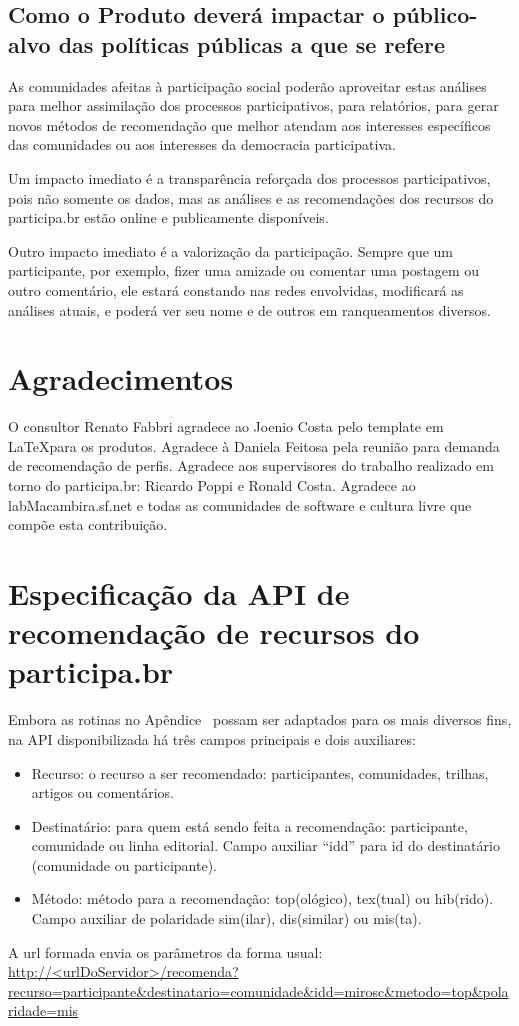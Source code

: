 \documentclass[12pt]{article}
\begin{document}
\subsection{Como o Produto deverá impactar o público-alvo das políticas públicas a que se refere}
As comunidades afeitas à participação social poderão aproveitar estas análises para melhor assimilação dos processos participativos, para relatórios, para gerar novos métodos de recomendação que melhor atendam aos interesses específicos das comunidades ou aos interesses da democracia participativa.

Um impacto imediato é a transparência reforçada dos processos participativos, pois não somente os dados, mas as análises e as recomendações dos recursos do participa.br estão online e publicamente disponíveis.

Outro impacto imediato é a valorização da participação. Sempre que um participante, por exemplo, fizer uma amizade ou comentar uma postagem ou outro comentário, ele estará constando nas redes envolvidas, modificará as análises atuais, e poderá ver seu nome e de outros em ranqueamentos diversos.

\section{Agradecimentos}
O consultor Renato Fabbri agradece ao Joenio Costa pelo template em \LaTeX para os produtos. Agradece à Daniela Feitosa pela reunião para demanda de recomendação de perfis. Agradece aos supervisores do trabalho realizado em torno do participa.br: Ricardo Poppi e Ronald Costa. Agradece ao labMacambira.sf.net e todas as comunidades de software e cultura livre que compõe esta contribuição.
\newpage

\newpage

\newpage
\printindex
\newpage
%
\appendix
\section{Especificação da API de recomendação de recursos do participa.br}\label{sec:api}
Embora as rotinas no Apêndice~\cite{sec:algs} possam ser adaptados para os mais diversos fins, na API disponibilizada há três campos principais e dois auxiliares:
\begin{itemize}
    \item Recurso: o recurso a ser recomendado: participantes, comunidades, trilhas, artigos ou comentários.
    \item Destinatário: para quem está sendo feita a recomendação: participante, comunidade ou linha editorial. Campo auxiliar ``idd'' para id do destinatário (comunidade ou participante).
    \item Método: método para a recomendação: top(ológico), tex(tual) ou hib(rido). Campo auxiliar de polaridade sim(ilar), dis(similar) ou mis(ta).
\end{itemize} 
A url formada envia os parâmetros da forma usual:
\url{http://<urlDoServidor>/recomenda?recurso=participante&destinatario=comunidade&idd=mirosc&metodo=top&polaridade=mis}
\end{document}
